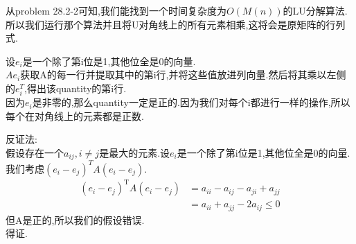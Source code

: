 \documentclass[a4paper, justified]{tufte-handout}
\begin{document}
\begin{problem}[TC 28.2-3]
\end{problem}

\begin{solution}
  从problem 28.2-2可知,我们能找到一个时间复杂度为$O(M(n))$的LU分解算法.所以我们运行那个算法并且将U对角线上的所有元素相乘,这将会是原矩阵的行列式.
\end{solution}

\begin{problem}[TC 28.3-1]
\end{problem}

\begin{solution}
  设$e_i$是一个除了第i位是1,其他位全是0的向量.\\
  $Ae_i$获取A的每一行并提取其中的第i行,并将这些值放进列向量.然后将其乘以左侧的$e^{T}_i$,得出该quantity的第i行.\\
  因为$e_i$是非零的,那么quantity一定是正的.因为我们对每个i都进行一样的操作,所以每个在对角线上的元素都是正数.
\end{solution}

\begin{problem}[TC 28.3-3]
\end{problem}

\begin{solution}
  反证法:\\
  假设存在一个$a_{ij},i\neq j$是最大的元素.设$e_i$是一个除了第i位是1,其他位全是0的向量.\\
  我们考虑$(e_i-e_j)^TA(e_i-e_j)$.\\
  $$
    \begin{aligned}
      \left(e_i-e_j\right)^{\mathrm{T}} A\left(e_i-e_j\right) & =a_{i i}-a_{i j}-a_{j i}+a_{j j}  \\
                                                              & =a_{i i}+a_{j j}-2 a_{i j} \leq 0
    \end{aligned}
  $$
  但A是正的,所以我们的假设错误.\\
  得证.
\end{solution}

%
\end{document}
